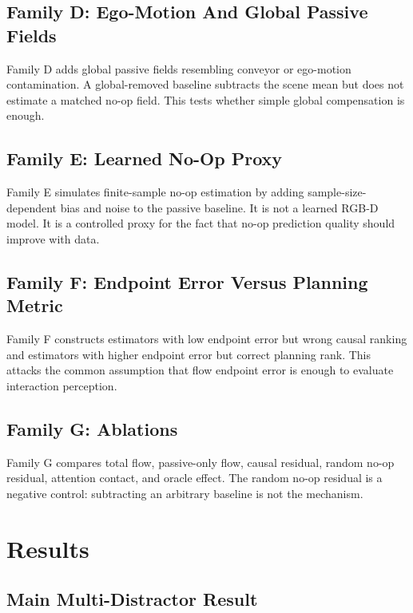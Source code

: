 \documentclass{article}
\begin{document}
\subsection{Family D: Ego-Motion And Global Passive Fields}

Family D adds global passive fields resembling conveyor or ego-motion contamination.  A
global-removed baseline subtracts the scene mean but does not estimate a matched no-op
field.  This tests whether simple global compensation is enough.

\subsection{Family E: Learned No-Op Proxy}

Family E simulates finite-sample no-op estimation by adding sample-size-dependent bias and
noise to the passive baseline.  It is not a learned RGB-D model.  It is a controlled
proxy for the fact that no-op prediction quality should improve with data.

\subsection{Family F: Endpoint Error Versus Planning Metric}

Family F constructs estimators with low endpoint error but wrong causal ranking and
estimators with higher endpoint error but correct planning rank.  This attacks the common
assumption that flow endpoint error is enough to evaluate interaction perception.

\subsection{Family G: Ablations}

Family G compares total flow, passive-only flow, causal residual, random no-op residual,
attention contact, and oracle effect.  The random no-op residual is a negative control:
subtracting an arbitrary baseline is not the mechanism.

\section{Results}

\subsection{Main Multi-Distractor Result}
\end{document}
